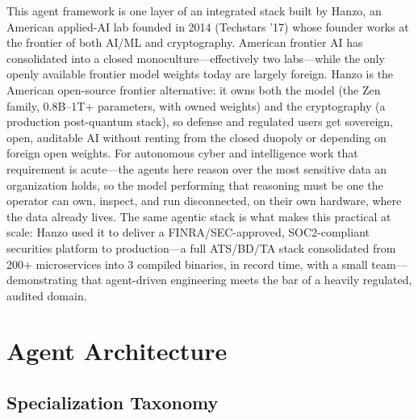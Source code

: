 \documentclass[11pt,letterpaper]{article}
\begin{document}
This agent framework is one layer of an integrated stack built by Hanzo, an American applied-AI lab founded in 2014 (Techstars '17) whose founder works at the frontier of both AI/ML and cryptography. American frontier AI has consolidated into a closed monoculture---effectively two labs---while the only openly available frontier model weights today are largely foreign. Hanzo is the American open-source frontier alternative: it owns both the model (the Zen family, 0.8B--1T+ parameters, with owned weights) and the cryptography (a production post-quantum stack), so defense and regulated users get sovereign, open, auditable AI without renting from the closed duopoly or depending on foreign open weights. For autonomous cyber and intelligence work that requirement is acute---the agents here reason over the most sensitive data an organization holds, so the model performing that reasoning must be one the operator can own, inspect, and run disconnected, on their own hardware, where the data already lives. The same agentic stack is what makes this practical at scale: Hanzo used it to deliver a FINRA/SEC-approved, SOC2-compliant securities platform to production---a full ATS/BD/TA stack consolidated from 200+ microservices into 3 compiled binaries, in record time, with a small team---demonstrating that agent-driven engineering meets the bar of a heavily regulated, audited domain.

\section{Agent Architecture}

\subsection{Specialization Taxonomy}
\end{document}
